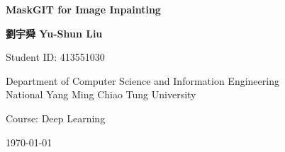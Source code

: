 \begin{titlepage}
    \begin{center}
        \vspace*{2cm}
        
        \Huge
        \textbf{MaskGIT for Image Inpainting}
        
        \vspace{1.5cm}
        
        \Large
        \textbf{劉宇舜 Yu-Shun Liu}
        
        \vspace{1cm}
        
        \large
        Student ID: 413551030
        
        \vspace{2cm}
        
        \large
        Department of Computer Science and Information Engineering\\
        National Yang Ming Chiao Tung University
        
        \vspace{1cm}
        
        \large
        Course: Deep Learning
        
        \vspace{1cm}
        
        \large
        \today
        
    \end{center}
\end{titlepage} 